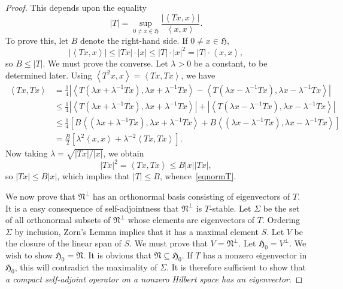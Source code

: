 \documentclass[12pt,reqno]{book}%
\theoremstyle{definition}
\theoremstyle{remark}
\theoremstyle{theorem}
\theoremstyle{remark}
\begin{document}
\begin{proof}%
    This depends upon the equality
    \begin{equation}\label{eqnormT}
        |T| = \sup_{0 \neq x \in \mathfrak{H}} \frac{|{\left\langle T x, x\right\rangle}|}{{\left\langle x, x\right\rangle}}.
    \end{equation}
    To prove this, let $B$ denote the right-hand side.
    If $0 \neq x \in \mathfrak{H}$,
    \[
        |{\left\langle T x, x\right\rangle}| \leq |T x| \cdot |x| \leq |T| \cdot |x|^2 =  |T| \cdot {\left\langle x, x\right\rangle},
    \]
    so $B \leq |T|$.
    We must prove the converse.
    Let $\lambda > 0$ be a constant, to be determined later.
    Using ${\left\langle T^2x, x\right\rangle} = {\left\langle T x, T x\right\rangle}$, we have
    \begin{align*}
        {\left\langle T x, T x\right\rangle} &= \frac{1}{4} |{\left\langle T(\lambda x + \lambda^{-1}T x), \lambda x + \lambda^{-1}T x\right\rangle} - {\left\langle T(\lambda x - \lambda^{-1}T x), \lambda x - \lambda^{-1}T x\right\rangle}| \\
        &\leq \frac{1}{4} |{\left\langle T(\lambda x + \lambda^{-1}T x), \lambda x + \lambda^{-1}T x\right\rangle}| + |{\left\langle T(\lambda x - \lambda^{-1}T x), \lambda x - \lambda^{-1}T x\right\rangle}| \\
        &\leq \frac{1}{4} [B{\left\langle (\lambda x + \lambda^{-1}T x), \lambda x + \lambda^{-1}T x\right\rangle} + B{\left\langle (\lambda x - \lambda^{-1}T x), \lambda x - \lambda^{-1}T x\right\rangle}] \\
        &= \frac{B}{2} [\lambda^2 {\left\langle x, x\right\rangle} + \lambda^{-2}{\left\langle T x, T x\right\rangle}].
    \end{align*}
    Now taking $\lambda = \sqrt{|T x|/|x|}$, we obtain
    \[
        |T x|^2 = {\left\langle T x, T x\right\rangle} \leq B|x||T x|,
    \]
    so $|T x| \leq B|x|$, which implies that $|T| \leq B$, whence~\eqref{eqnormT}.

    We now prove that $\mathfrak{N}^\perp$ has an orthonormal basis consisting of eigenvectors of $T$.
    It is a easy consequence of self-adjointness that $\mathfrak{N}^\perp$ is $T$-stable.
    Let $\Sigma$ be the set of all orthonormal subsets of $\mathfrak{N}^\perp$ whose elements are eigenvectors of $T$.
    Ordering $\Sigma$ by inclusion, Zorn's Lemma implies that it has a maximal element $S$.
    Let $V$ be the closure of the linear span of $S$.
    We must prove that $V = \mathfrak{N}^\perp$.
    Let $\mathfrak{H}_0 = V^\perp$.
    We wish to show $\mathfrak{H}_0 = \mathfrak{N}$.
    It is obvious that $\mathfrak{N} \subseteq \mathfrak{H}_0$.
    If $T$ has a nonzero eigenvector in $\mathfrak{H}_0$, this will contradict the maximality of $\Sigma$.
    It is therefore sufficient to show that \emph{a compact self-adjoint operator on a nonzero Hilbert space has an eigenvector}.


\end{proof}
\end{document}
